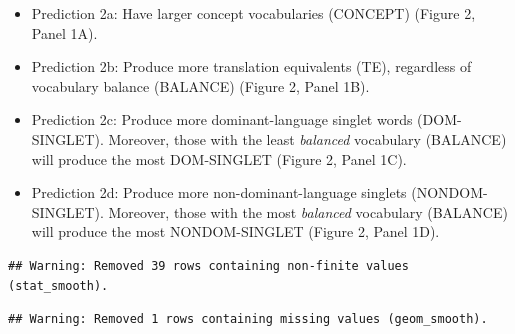 \documentclass[
  english,
  ,man,floatsintext]{apa6}
\providecommand{\tightlist}{%
  \setlength{\itemsep}{0pt}\setlength{\parskip}{0pt}}
\begin{document}
\begin{itemize}
\tightlist
\item
  Prediction 2a: Have larger concept vocabularies (CONCEPT) (Figure 2, Panel 1A).
\item
  Prediction 2b: Produce more translation equivalents (TE), regardless of vocabulary balance (BALANCE) (Figure 2, Panel 1B).
\item
  Prediction 2c: Produce more dominant-language singlet words (DOM-SINGLET). Moreover, those with the least \emph{balanced} vocabulary (BALANCE) will produce the most DOM-SINGLET (Figure 2, Panel 1C).
\item
  Prediction 2d: Produce more non-dominant-language singlets (NONDOM-SINGLET). Moreover, those with the most \emph{balanced} vocabulary (BALANCE) will produce the most NONDOM-SINGLET (Figure 2, Panel 1D).
\end{itemize}

\begin{verbatim}
## Warning: Removed 39 rows containing non-finite values (stat_smooth).
\end{verbatim}

\begin{verbatim}
## Warning: Removed 1 rows containing missing values (geom_smooth).
\end{verbatim}
\end{document}
